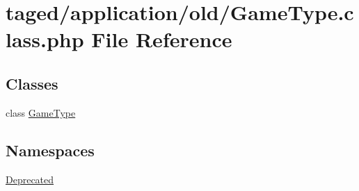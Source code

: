 \hypertarget{_game_type_8class_8php}{}\section{taged/application/old/\+Game\+Type.class.\+php File Reference}
\label{_game_type_8class_8php}
\subsection*{Classes}
\begin{DoxyCompactItemize}
\item 
class \hyperlink{class_game_type}{Game\+Type}
\end{DoxyCompactItemize}
\subsection*{Namespaces}
\begin{DoxyCompactItemize}
\item 
 \hyperlink{namespace_deprecated}{Deprecated}
\end{DoxyCompactItemize}
